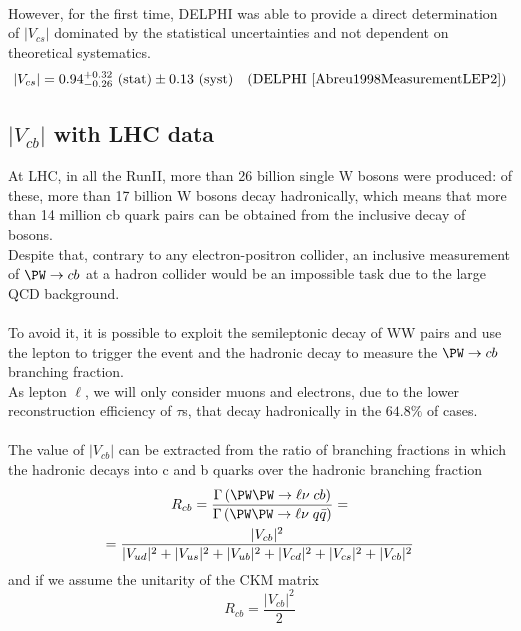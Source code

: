 \\
However, for the first time, DELPHI was able to provide a direct determination of $|V_{cs}|$ dominated by the statistical uncertainties and not dependent on theoretical systematics.
\begin{equation}
\begin{aligned}
    |V_{cs}|&=0.94^{+0.32}_{-0.26}  \text{ (stat)} \pm 0.13 \text{ (syst)} & \text{(DELPHI \cite{Abreu1998MeasurementLEP2})}
\end{aligned}
\end{equation}


\subsection{$|V_{cb}|$ with LHC data}
At LHC, in all the RunII, more than 26 billion single W bosons were produced: of these, more than 17 billion W bosons decay hadronically, which means that more than 14 million cb quark pairs can be obtained from the inclusive decay of \PW bosons.\\
Despite that, contrary to any electron-positron collider, an inclusive measurement of $\PW \to cb$ at a hadron collider would be an impossible task due to the large QCD background.\\
\\
To avoid it, it is possible to exploit the semileptonic decay of WW pairs and use the lepton to trigger the event and the hadronic \PW decay to measure the $\PW \to cb$ branching fraction.\\
As lepton $\ell$, we will only consider muons and electrons, due to the lower reconstruction efficiency of $\tau$s, that decay hadronically in the $64.8\%$ of cases.
\\
\\
The value of $|V_{cb}|$ can be extracted from the ratio of branching fractions in which the hadronic \PW decays into c and b quarks over the  \PW hadronic branching fraction
\begin{equation}
\begin{gathered}
    R_{cb}=\frac{\Gamma\left(\PW\PW \to \ell \nu\; cb\right)}{\Gamma\left(\PW\PW \to \ell \nu\; q\bar{q}\right)}=\\ =\frac{|V_{cb}|^2}{|V_{ud}|^2+|V_{us}|^2+|V_{ub}|^2+|V_{cd}|^2+|V_{cs}|^2+|V_{cb}|^2}
\end{gathered}
\end{equation}
and if we assume the unitarity of the CKM matrix
\begin{equation}
    R_{cb}=\frac{|V_{cb}|^2}{2}
\end{equation}

